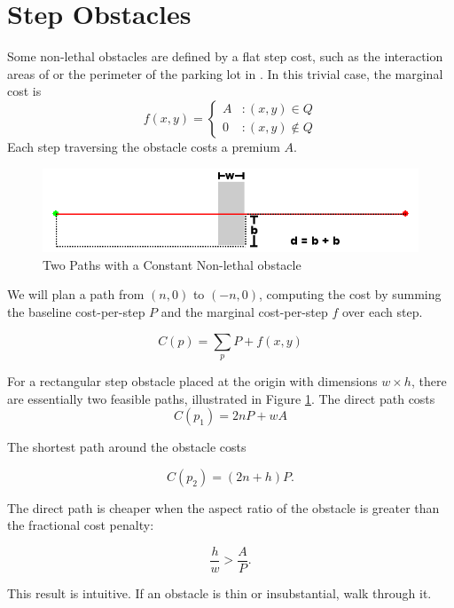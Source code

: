 \section{Step Obstacles}
Some non-lethal obstacles are defined by a flat step cost, such as the interaction areas of \citet{fraichard:anthronav} or the perimeter of the parking lot in \citet{likhachev:costmaps}. In this trivial case, the marginal cost is
\begin{equation}
   \displaystyle
   f(x, y) = \left\{
     \begin{array}{lr}
       A & : (x,y) \in Q\\
       0 & : (x,y) \notin Q
     \end{array}
   \right.
\end{equation}
Each step traversing the obstacle costs a premium $A$. 

\begin{figure}[!t]
\includegraphics[width=\columnwidth]{graphix/Constant.png}
\caption{Two Paths with a Constant Non-lethal obstacle}
\label{fig:constant}
\end{figure}

We will plan a path from $(n, 0)$ to $(-n, 0)$, computing the cost by summing the baseline cost-per-step $P$ and the marginal cost-per-step $f$ over each step.

\begin{equation}
C(p) = \sum\limits_p P + f(x, y)
\end{equation}

For a rectangular step obstacle placed at the origin with dimensions $w\times h$, there are essentially two feasible paths, illustrated in Figure \ref{fig:constant}. The direct path costs
\begin{equation}
C(p_1) = 2nP + wA
\end{equation}

The shortest path around the obstacle costs

\begin{equation}
C(p_2) = (2n + h)P.
\end{equation}

The direct path is cheaper when the aspect ratio of the obstacle  is greater than the fractional cost penalty:

\begin{equation}
\frac{h}{w} > \frac{A}{P}.
\end{equation}

This result is intuitive. If an obstacle is thin or insubstantial, walk through it.




